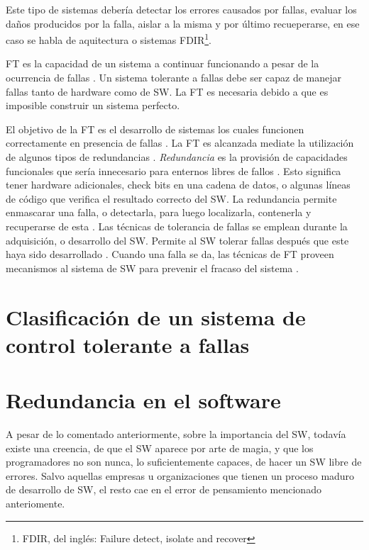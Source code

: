 Este tipo de sistemas debería detectar los errores causados por fallas, evaluar los daños 
producidos por la falla, aislar a la misma y por último recueperarse, en ese caso se habla de 
aquitectura o sistemas \acs{FDIR}\footnote{FDIR, del inglés: Failure detect, isolate and recover}.

\ac{FT} es la capacidad de un sistema a continuar funcionando a pesar de la ocurrencia 
de fallas \citep{FTDesign}. Un sistema tolerante a fallas debe ser capaz de manejar fallas tanto de 
hardware como de \ac{SW}. La \ac{FT} es necesaria debido a que es imposible construir 
un sistema perfecto.

El objetivo de la \ac{FT} es el desarrollo de sistemas los cuales funcionen correctamente en 
presencia de fallas \citep{FTDesign}. La \ac{FT} es alcanzada mediate la utilización de algunos 
tipos de redundancias \citep{FTDesign}. \textit{Redundancia} es la provisión de capacidades 
funcionales que sería innecesario para enternos libres de fallos \citep{FTDesign}. Esto significa 
tener hardware adicionales, check bits en una cadena de datos, o algunas l\'ineas de c\'odigo que 
verifica el resultado correcto del \ac{SW}. La redundancia permite enmascarar una falla, o 
detectarla, para luego localizarla, contenerla y recuperarse de esta \citep{FTDesign}. Las 
técnicas de tolerancia de fallas se emplean durante la adquisición, o desarrollo del \ac{SW}. 
Permite al \ac{SW} tolerar fallas después que este haya sido desarrollado \citep{Pullum01}. Cuando 
una falla se da, las técnicas de \ac{FT} proveen mecanismos al sistema de \ac{SW} para prevenir el 
fracaso del sistema \citep{Pullum01}.

\section{Clasificación de un sistema de control tolerante a fallas}

\section{Redundancia en el software}
A pesar de lo comentado anteriormente, sobre la importancia del \ac{SW}, todavía existe una 
creencia, de que el \ac{SW} aparece por arte de magia, y que los programadores no son nunca, lo 
suficientemente capaces, de hacer un \ac{SW} libre de errores. Salvo aquellas empresas u 
organizaciones que tienen un proceso maduro de desarrollo de \ac{SW}, el resto cae en el error de 
pensamiento mencionado anteriomente. 

